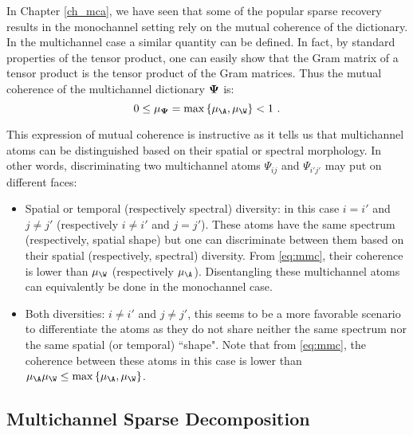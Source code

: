 In Chapter \ref{ch_mca}, we have seen that some of the popular sparse recovery results in the monochannel setting rely on the mutual coherence of the dictionary. In the multichannel case a similar quantity can be defined. In fact, by standard properties of the tensor product, one can easily show that the Gram matrix of a tensor product is the tensor product of the Gram matrices. Thus the mutual coherence of the multichannel dictionary $\bf \Psi$ is:
\begin{equation}
\label{eq:mmc}
0 \le \mu_{\bf \Psi}  =  \max\left\{\mu_{\A},\mu_{\W}\right\} < 1 ~ .
\end{equation}

This expression of mutual coherence is instructive as it tells us that multichannel atoms can be distinguished based on their spatial or spectral morphology. In other words, discriminating two multichannel atoms $\Psi_{ij}$ and $\Psi_{i'j'}$ may put on different faces:
\begin{itemize}
\item{Spatial or temporal (respectively spectral) diversity:} in this case $i=i'$ and $j \neq j'$ (respectively $i \neq i'$ and $j = j'$). These atoms have the same spectrum (respectively, spatial shape) but one can discriminate between them based on their spatial (respectively, spectral) diversity. From \eqref{eq:mmc}, their coherence is lower than $\mu_{{\W}}$ (respectively $\mu_{{\A}}$). Disentangling these multichannel atoms can equivalently be done in the monochannel case.

\item{Both diversities:} $i \neq i'$ and $j \neq j'$, this seems to be a more favorable scenario to differentiate the atoms as they do not share neither the same spectrum nor the same spatial (or temporal) ``shape". Note that from \eqref{eq:mmc}, the coherence between these atoms in this case is lower than $\mu_{{\A}}\mu_{{\W}} \le \max\left\{\mu_{\A},\mu_{\W}\right\}$.
\end{itemize}

\subsection{Multichannel Sparse Decomposition}

